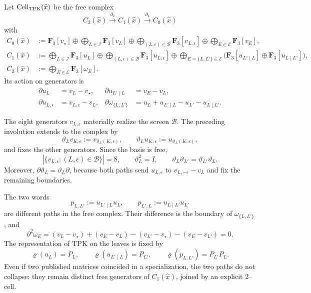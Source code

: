 \begin{definition}
\label{def:pdfv2-cor-completacion-celular-tpk}
Let \(\operatorname{Cell}_{\rm TPK}(\widehat x)\) be the free complex
\[
 C_2(\widehat x)\xrightarrow{\partial_2}
 C_1(\widehat x)\xrightarrow{\partial_1}C_0(\widehat x)
\]
with
\begin{align*}
 C_0(\widehat x)
 &:=
 \mathbf F_3[v_\star]\oplus
 \bigoplus_{L\in\mathscr I}\mathbf F_3[v_L]\oplus
 \bigoplus_{(L,\epsilon)\in\mathscr B}
       \mathbf F_3[v_{L,\epsilon}]\oplus
 \bigoplus_{E\in\mathscr E}\mathbf F_3[v_E],\\
 C_1(\widehat x)
 &:=
 \bigoplus_{L\in\mathscr I}\mathbf F_3[u_L]\oplus
 \bigoplus_{(L,\epsilon)\in\mathscr B}
       \mathbf F_3[u_{L,\epsilon}]\oplus
 \bigoplus_{E=\{L,L'\}\in\mathscr E}
 \bigl(\mathbf F_3[u_{L'\mid L}]
       \oplus\mathbf F_3[u_{L\mid L'}]\bigr),\\
 C_2(\widehat x)
 &:=
 \bigoplus_{E\in\mathscr E}\mathbf F_3[\omega_E].
\end{align*}
Its action on generators is
\begin{align}
 \partial u_L&=v_L-v_\star,
 &
 \partial u_{L'\mid L}&=v_E-v_L,
 \label{eq:pdfv2-cor-cell-frontera-aristas}\\
 \partial u_{L,\epsilon}&=v_{L,\epsilon}-v_L,
 &
 \partial\omega_{\{L,L'\}}
 &=u_L+u_{L'\mid L}-u_{L'}-u_{L\mid L'}.
 \label{eq:pdfv2-cor-cell-frontera-celda}
\end{align}
\end{definition}

The eight generators \(v_{L,\epsilon}\) materially realize the screen
\(\mathscr B\). The preceding involution extends to the complex by
\begin{equation}
\label{eq:pdfv2-cor-pantalla-ocho-generadores}
 \vartheta_Lv_{K,\epsilon}:=v_{\vartheta_L(K,\epsilon)},\qquad
 \vartheta_Lu_{K,\epsilon}:=u_{\vartheta_L(K,\epsilon)},
\end{equation}
and fixes the other generators. Since the basis is free,
\begin{equation}
\label{eq:pdfv2-cor-pantalla-ocho-no-colapso}
 |\{v_{L,\epsilon}:(L,\epsilon)\in\mathscr B\}|=8,\qquad
 \vartheta_L^2=I,\qquad
 \vartheta_L\vartheta_{L'}=\vartheta_{L'}\vartheta_L.
\end{equation}
Moreover, \(\partial\vartheta_L=\vartheta_L\partial\), because both paths
send \(u_{L,\epsilon}\) to \(v_{L,-\epsilon}-v_L\) and fix the remaining
boundaries.

The two words
\[
 p_{L,L'}:=u_{L'\mid L}u_L,\qquad
 p_{L',L}:=u_{L\mid L'}u_{L'}
\]
are different paths in the free complex. Their difference is the boundary of
\(\omega_{\{L,L'\}}\), and
\begin{equation}
\label{eq:pdfv2-cor-cell-dos-cero}
 \partial^2\omega_E
 =(v_L-v_\star)+(v_E-v_L)
 -(v_{L'}-v_\star)-(v_E-v_{L'})=0.
\end{equation}
The representation of TPK on the leaves is fixed by
\[
 \varrho(u_L)=P_L,\qquad
 \varrho(u_{L'\mid L})=P_{L'},\qquad
 \varrho(p_{L,L'})=P_{L'}P_L.
\]
Even if two published matrices coincided in a specialization, the two
paths do not collapse: they remain distinct free generators of
\(C_1(\widehat x)\), joined by an explicit 2--cell.

